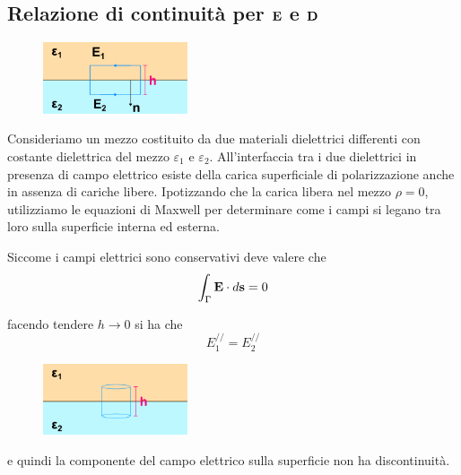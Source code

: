 \subsection{Relazione di continuit\`a per $\bold{E}$ e $\bold{D}$}

\begin{figure} %
    \centering
    \includegraphics[width=0.38\textwidth]{images/nounidiel} %
\end{figure}
Consideriamo un mezzo costituito da due materiali dielettrici differenti con costante dielettrica del mezzo $\varepsilon_1$ e $\varepsilon_2$. All'interfaccia tra i due dielettrici in presenza di campo elettrico esiste della carica superficiale di polarizzazione anche in assenza di cariche libere. Ipotizzando che la carica libera nel mezzo $\rho = 0$, utilizziamo le equazioni di Maxwell per determinare come i campi si legano tra loro sulla superficie interna ed esterna.

Siccome i campi elettrici sono conservativi deve valere che 
\begin{equation*}
	\int_{\Gamma} \bold{E} \cdot d\bold{s} = 0
\end{equation*}

facendo tendere $h \to 0 $ si ha che 
\begin{equation*}
	E_{1}^{//} = E_{2}^{//}
\end{equation*}
\begin{figure} %
    \centering
    \includegraphics[width=0.38\textwidth]{images/nounidiel1} %
\end{figure}
e quindi la componente del campo elettrico sulla superficie non ha discontinuit\`a. 

